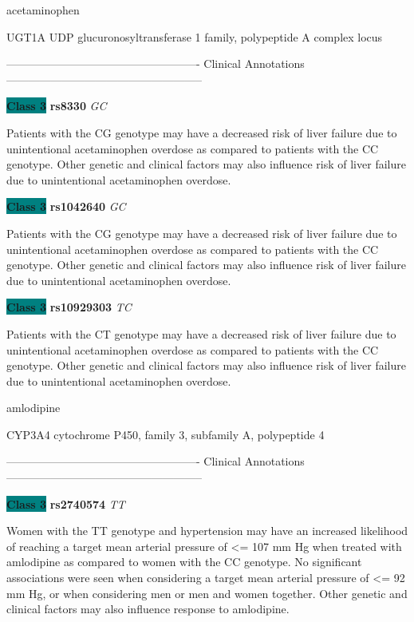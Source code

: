 \documentclass{resume} %
\begin{document}
\begin{rSection}{ acetaminophen }
\begin{rSubsection}{ UGT1A }{ UDP glucuronosyltransferase 1 family, polypeptide A complex locus }{}{}
\item[] ---------------------------------------------------- Clinical Annotations -----------------------------------------------------\newline
\item \textbf{\colorbox{teal} {Class 3}} \textbf{ rs8330 } \textit{ GC }
\item[] Patients with the CG genotype may have a decreased risk of liver failure due to unintentional acetaminophen overdose as compared to patients with the CC genotype. Other genetic and clinical factors may also influence risk of liver failure due to unintentional acetaminophen overdose.\item \textbf{\colorbox{teal} {Class 3}} \textbf{ rs1042640 } \textit{ GC }
\item[] Patients with the CG genotype may have a decreased risk of liver failure due to unintentional acetaminophen overdose as compared to patients with the CC genotype. Other genetic and clinical factors may also influence risk of liver failure due to unintentional acetaminophen overdose.\item \textbf{\colorbox{teal} {Class 3}} \textbf{ rs10929303 } \textit{ TC }
\item[] Patients with the CT genotype may have a decreased risk of liver failure due to unintentional acetaminophen overdose as compared to patients with the CC genotype. Other genetic and clinical factors may also influence risk of liver failure due to unintentional acetaminophen overdose.
\end{rSubsection}

\end{rSection}\begin{rSection}{ amlodipine }
\item[]

\begin{rSubsection}{ CYP3A4 }{ cytochrome P450, family 3, subfamily A, polypeptide 4 }{}{}
\item[]

\item[] ---------------------------------------------------- Clinical Annotations -----------------------------------------------------\newline
\item \textbf{\colorbox{teal} {Class 3}} \textbf{ rs2740574 } \textit{ TT }
\item[] Women with the TT genotype and hypertension may have an increased likelihood of reaching a target mean arterial pressure of <= 107 mm Hg when treated with amlodipine as compared to women with the CC genotype. No significant associations were seen when considering a target mean arterial pressure of <= 92 mm Hg, or when considering men or men and women together. Other genetic and clinical factors may also influence response to amlodipine.
\end{rSubsection}


\end{rSection}
\end{document}

